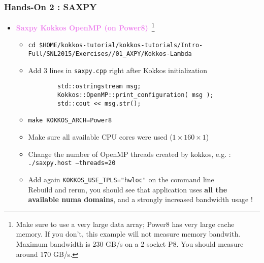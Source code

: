 \begin{frame}[fragile=singleslide]
  \frametitle{Hands-On 2 : SAXPY}

  \begin{itemize}
  \item \textcolor{violet}{\textbf{Saxpy Kokkos OpenMP (on Power8)}}~\footnote{Make sure to use a very large data array; Power8 has very large cache memory. If you don't, this example will not measure memory bandwith. Maximum bandwidth is 230 GB/s on a 2 socket P8. You should measure around 170 GB/s.}
    \begin{itemize}
    \item \texttt{cd \$HOME/kokkos-tutorial/kokkos-tutorials/Intro-Full/SNL2015/Exercises//01\_AXPY/Kokkos-Lambda}
    \item Add 3 lines in \texttt{saxpy.cpp} right after Kokkos initialization
      \begin{verbatim}
        std::ostringstream msg;
        Kokkos::OpenMP::print_configuration( msg );
        std::cout << msg.str();
      \end{verbatim}
    \item \texttt{make KOKKOS\_ARCH=Power8}
    \item Make sure all available CPU cores were used ($1\times 160 \times 1$)
    \item Change the number of OpenMP threads created by kokkos, e.g. :\\
      \texttt{./saxpy.host  --threads=20}
    \item Add again \texttt{KOKKOS\_USE\_TPLS="hwloc"} on the command line\\
      Rebuild and rerun, you should see that application uses \textbf{all the available numa domains}, and a strongly increased bandwidth usage !
    \end{itemize}
  \end{itemize}

\end{frame}

